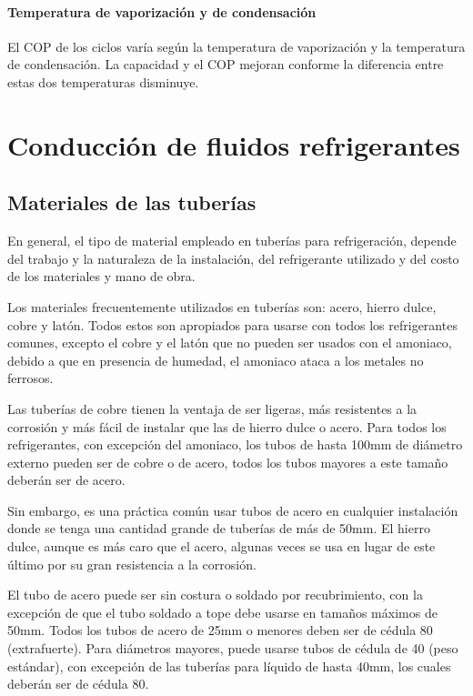 	\paragraph{Temperatura de vaporización y de condensación} El COP de los ciclos varía según la temperatura de vaporización y la temperatura de condensación. La capacidad y el COP mejoran conforme la diferencia entre estas dos temperaturas disminuye. 

	\newpage

	\section{Conducción de fluidos refrigerantes}


	\subsection{Materiales de las tuberías}

	En general, el tipo de material empleado en tuberías para refrigeración, depende del trabajo y la naturaleza de la instalación, del refrigerante utilizado y del costo de los materiales y mano de obra.

	Los materiales frecuentemente utilizados en tuberías son: acero, hierro dulce, cobre y latón. Todos estos son apropiados para usarse con todos los refrigerantes comunes, excepto el cobre y el latón que no pueden ser usados con el amoniaco, debido a que en presencia de humedad, el amoniaco ataca a los metales no ferrosos.

	Las tuberías de cobre tienen la ventaja de ser ligeras, más resistentes a la corrosión y más fácil de instalar que las de hierro dulce o acero. Para todos los refrigerantes, con excepción del amoniaco, los tubos de hasta 100mm de diámetro externo pueden ser de cobre o de acero, todos los tubos mayores a este tamaño deberán ser de acero.

	Sin embargo, es una práctica común usar tubos de acero en cualquier instalación donde se tenga una cantidad grande de tuberías de más de 50mm. El hierro dulce, aunque es más caro que el acero, algunas veces se usa en lugar de este último por su gran resistencia a la corrosión.

	El tubo de acero puede ser sin costura o soldado por recubrimiento, con la excepción de que el tubo soldado a tope debe usarse en tamaños máximos de 50mm. Todos los tubos de acero de 25mm o menores deben ser de cédula 80 (extrafuerte). Para diámetros mayores, puede usarse tubos de cédula de 40 (peso estándar), con excepción de las tuberías para líquido de hasta 40mm, los cuales deberán ser de cédula 80.

